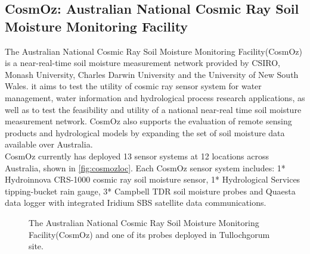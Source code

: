 \subsection{CosmOz: Australian National Cosmic Ray Soil Moisture Monitoring Facility} 
The Australian National Cosmic Ray Soil Moisture Monitoring Facility(CosmOz) is a near-real-time soil moisture measurement network provided by CSIRO, Monash University, Charles Darwin University and the University of New South Wales\citep{cosmoz2014}. it aims to test the utility of cosmic ray sensor system for water management, water information and hydrological process research applications, as well as to test the feasibility and utility of a national near-real time soil moisture measurement network. CosmOz also supports the evaluation of remote sensing products and hydrological models by expanding the set of soil moisture data available over Australia.\\
\newline
CosmOz currently has deployed 13 sensor systems at 12 locations across Australia, shown in \autoref{fig:cosmozloc}. Each CosmOz sensor system includes: 1* Hydroinnova CRS-1000 cosmic ray soil moisture sensor, 1* Hydrological Services tipping-bucket rain gauge, 3* Campbell TDR soil moisture probes and Quaesta data logger with integrated Iridium SBS satellite data communications.
\begin{figure}[hbt]
\myfloatalign
{} \quad
{}
\caption{The Australian National Cosmic Ray Soil Moisture Monitoring Facility(CosmOz) and one of its probes deployed in Tullochgorum site.}
\label{fig:cosmoz}
\end{figure}

